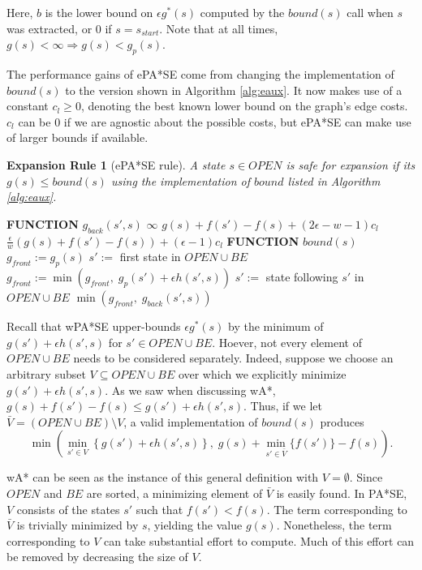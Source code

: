 \documentclass[letterpaper]{article}
\newtheorem{rul}{Expansion Rule}
\begin{document}
Here, $b$ is the lower bound on $\epsilon g^*(s)$ computed by the $bound(s)$ call when $s$ was extracted, or $0$ if $s=s_{start}$. Note that at all times, $g(s) < \infty \Rightarrow g(s) < g_p(s)$.

The performance gains of ePA*SE come from changing the implementation of $bound(s)$ to the version shown in Algorithm \ref{alg:eaux}. It now makes use of a constant $c_l \ge 0$, denoting the best known lower bound on the graph's edge costs. $c_l$ can be 0 if we are agnostic about the possible costs, but ePA*SE can make use of larger bounds if available.

\begin{rul}[ePA*SE rule]
A state $s\in OPEN$ is safe for expansion if its $g(s) \le bound(s)$ using the implementation of $bound$ listed in Algorithm \ref{alg:eaux}.
\end{rul}

\begin{algorithm}
\caption{$bound(s)$ enhanced for ePA*SE/PARA*}
\label{alg:eaux}
\begin{algorithmic}
\STATE \textbf{FUNCTION} $g_{back}(s',s)$
\RETURN $\infty$
\RETURN $g(s) + f(s') - f(s) + (2\epsilon-w-1)c_l$
\ELSE
\RETURN $\frac\epsilon w\left(g(s) + f(s') - f(s)\right) + (\epsilon-1)c_l$
\ENDIF
\STATE \textbf{FUNCTION} $bound(s)$
\STATE $g_{front} := g_p(s)$
\STATE $s' :=$ first state in $OPEN \cup BE$
\STATE $g_{front} := \min(g_{front},\;g_p(s') + \epsilon h(s',s))$
\STATE $s' :=$ state following $s'$ in $OPEN \cup BE$
\ENDWHILE
\RETURN $\min(g_{front},\;g_{back}(s',s))$
\end{algorithmic}
\end{algorithm}

Recall that wPA*SE upper-bounds $\epsilon g^*(s)$ by the minimum of $g(s') + \epsilon h(s',s)$ for $s'\in OPEN\cup BE$. Hoever, not every element of $OPEN\cup BE$ needs to be considered separately. Indeed, suppose we choose an arbitrary subset $V\subseteq OPEN\cup BE$ over which we explicitly minimize $g(s') + \epsilon h(s',s)$. As we saw when discussing wA*, $g(s) + f(s') - f(s) \le g(s') + \epsilon h(s',s)$. Thus, if we let $\bar V = (OPEN\cup BE)\setminus V$, a valid implementation of $bound(s)$ produces 
\[\min\left(\min_{s'\in V}\left\{g(s') + \epsilon h(s',s)\right\},\;g(s) + \min_{s'\in\bar V} \{f(s')\} - f(s)  \right).\]

wA* can be seen as the instance of this general definition with $V = \emptyset$. Since $OPEN$ and $BE$ are sorted, a minimizing element of $\bar V$ is easily found. In PA*SE, $V$ consists of the states $s'$ such that $f(s') < f(s)$. The term corresponding to $\bar V$ is trivially minimized by $s$, yielding the value $g(s)$. Nonetheless, the term corresponding to $V$ can take substantial effort to compute. Much of this effort can be removed by decreasing the size of $V$.
\end{document}
